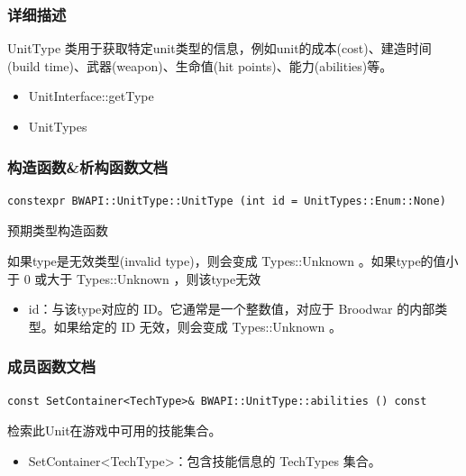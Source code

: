 \subsubsection{详细描述}
UnitType 类用于获取特定unit类型的信息，例如unit的成本(cost)、建造时间(build time)、武器(weapon)、生命值(hit points)、能力(abilities)等。
\begin{refer}
\begin{itemize}
    \item UnitInterface::getType
    \item UnitTypes
\end{itemize}
\end{refer}
\subsubsection{构造函数\&析构函数文档}
\begin{tcolorbox}[colback=white, colframe=black!60!white, title=UnitType(), arc=0mm]
    \begin{verbatim}
constexpr BWAPI::UnitType::UnitType (int id = UnitTypes::Enum::None)
    \end{verbatim}
预期类型构造函数\par
如果type是无效类型(invalid type)，则会变成   Types::Unknown  。如果type的值小于 0 或大于   Types::Unknown  ，则该type无效
\begin{parameter}
\begin{itemize}
    \item id：与该type对应的 ID。它通常是一个整数值，对应于 Broodwar 的内部类型。如果给定的 ID 无效，则会变成   Types::Unknown  。
\end{itemize}
\end{parameter}
\end{tcolorbox}

\subsubsection{成员函数文档}

\begin{tcolorbox}[colback=white, colframe=black!60!white, title=abilities(), arc=0mm]
    \begin{verbatim}
const SetContainer<TechType>& BWAPI::UnitType::abilities () const
    \end{verbatim}
检索此Unit在游戏中可用的技能集合。
\begin{return}
\begin{itemize}
    \item SetContainer<TechType>：包含技能信息的   TechTypes   集合。
\end{itemize}
\end{return}
\end{tcolorbox}


